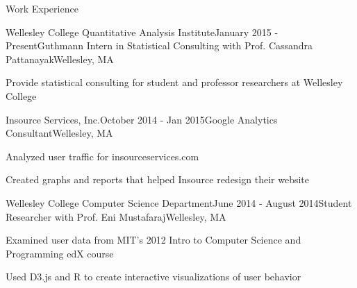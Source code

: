 \documentclass{resume} %
\begin{document}
\begin{rSection}{Work Experience}


\begin{rSubsection}{Wellesley College Quantitative Analysis Institute}{January 2015 - Present}{Guthmann Intern in Statistical Consulting with Prof. Cassandra Pattanayak}{Wellesley, MA}
\item Provide statistical consulting for student and professor researchers at Wellesley College
\end{rSubsection}


\begin{rSubsection}{Insource Services, Inc.}{October 2014 - Jan 2015}{Google Analytics Consultant}{Wellesley, MA}
\item Analyzed user traffic for insourceservices.com
\item Created graphs and reports that helped Insource redesign their website
\end{rSubsection}




\begin{rSubsection}{Wellesley College Computer Science Department}{June 2014 - August 2014}{Student Researcher with Prof. Eni Mustafaraj}{Wellesley, MA}
\item Examined user data from MIT's 2012 Intro to Computer Science and Programming edX course
\item Used D3.js and R to create interactive visualizations of user behavior
\end{rSubsection}




\end{rSection}
\end{document}
